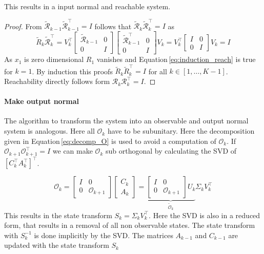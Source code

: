 \documentclass[doctype=mastersthesis,BCOR=15mm,biblatex]{ldvbook}%
\newcommand{\R}{\mathcal{R}} %
\newcommand{\Ob}{\mathcal{O}} %
\newcommand{\eye}{I} %
\begin{document}
\begin{itemize}
This results in a input normal and reachable system.
\begin{proof}
	From $\tilde{\R}_{k-1}\tilde{\R}_{k-1}^\top = \eye$ follows that $\tilde{\R}_k\tilde{\R}_k^\top = \eye$ as
	\begin{equation}\label{eq:induction_reach}
	\tilde{R}_k\tilde{\R}_k^\top
	=
	V_k^\top\begin{bmatrix}\tilde{\R}_{k-1} &0\\
		0& \eye \end{bmatrix}
	\begin{bmatrix}\tilde{\R}_{k-1}^\top &0\\
		0& \eye \end{bmatrix} V_k
	= 
	V_k^\top\begin{bmatrix}\eye &0\\
	0& \eye \end{bmatrix} V_k
	=
	\eye
	\end{equation}
	As $x_1$ is zero dimensional $R_1$ vanishes and Equation\,\ref{eq:induction_reach} is true for $k=1$.
	By induction this proofs $\tilde{R}_k\tilde{R}_k^\top = \eye$ for all $k \in [1,\dots,K-1]$.
	Reachability directly follows form $\R_k\R_k^\top = \eye$.
\end{proof}




\paragraph{Make output normal}
The algorithm to transform the system into an observable and output normal system is analogous.
Here all $\Ob_k$ have to be subunitary.
Here the decomposition given in Equation\,\ref{eq:decomp_O} is used to avoid a computation of $\Ob_k$.
If $\Ob_{k+1} \Ob_{k+1}^\top=\eye$ we can make $\Ob_{k}$ sub orthogonal by calculating the SVD of $[C_k^\top A_k^\top]^\top$.

\begin{equation}
	\Ob_{k}
	=
	\begin{bmatrix}
	\eye& 0 \\
	0& \Ob_{k+1}
	\end{bmatrix}
	\begin{bmatrix}
	C_k\\
	A_k
	\end{bmatrix}
	=
	\underbrace{
	\begin{bmatrix}
	\eye& 0 \\
	0& \Ob_{k+1}
	\end{bmatrix}
	U_k}_{\tilde{\Ob}_k}
	\Sigma_k V_k^\top
\end{equation}
This results in the state transform $S_k = \Sigma_k V_k^\top$.
Here the SVD is also in a reduced form, that results in a removal of all non observable states.
The state transform with $S_k^{-1}$ is done implicitly by the SVD.
The matrices $A_{k-1}$ and $C_{k-1}$ are updated with the state transform $S_k$


\end{itemize}
\end{document}
